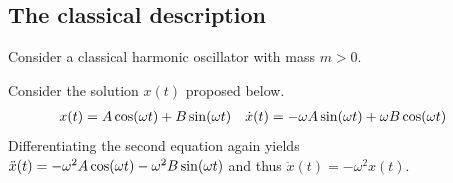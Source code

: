 \subsection{The classical description}

Consider a classical harmonic oscillator with mass $m > 0$.

\begin{answer}
	Consider the solution $x(t)$ proposed below.
	\begin{align}
		x(t)       & = A \cos\!\left(\omega t\right) + B \sin\!\left(\omega t\right)
		           &
		\dot{x}(t) & = - \omega A \sin\!\left(\omega t\right) + \omega B \cos\!\left(\omega t\right)
	\end{align}
	Differentiating the second equation again yields $\ddot{x}(t) = -\omega^2 A \cos\!\left(\omega t\right) - \omega^2 B \sin\!\left(\omega t\right)$ and thus $\ddot{x}(t) = - \omega^2 x(t)$.
\end{answer}

